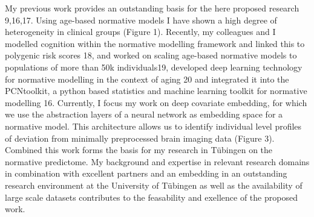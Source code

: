 My previous work provides an outstanding basis for the here proposed research 9,16,17. Using age-based normative models I have shown a high degree of heterogeneity in clinical groups (Figure 1). Recently, my colleagues and I modelled cognition within the normative modelling framework and linked this to polygenic risk scores 18, and worked on scaling age-based normative models to populations of more than 50k individuals19, developed deep learning technology for normative modelling in the context of aging 20 and integrated it into the PCNtoolkit, a python based statistics and machine learning toolkit for normative modelling 16. Currently, I focus my work on deep covariate embedding, for which we use the abstraction layers of a neural network as embedding space for a normative model. This architecture allows us to identify individual level profiles of deviation from minimally preprocessed brain imaging data (Figure 3). Combined this work forms the basis for my research in Tübingen on the normative predictome. My background and expertise in relevant research domains in combination with excellent partners and an embedding in an outstanding research environment at the University of Tübingen as well as the availability of large scale datasets contributes to the feasability and exellence of the proposed work.
